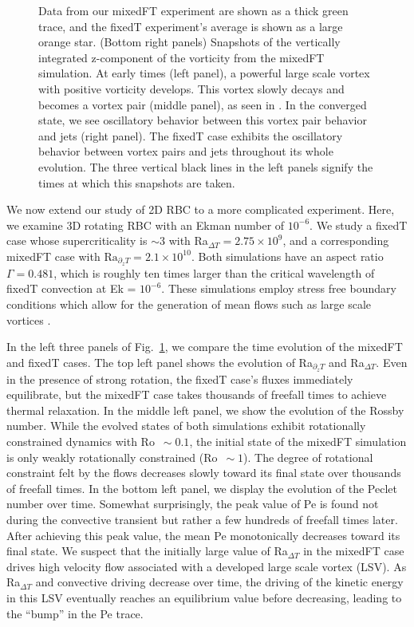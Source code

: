 \documentclass[aps, pre, onecolumn, nofootinbib, notitlepage, groupedaddress, amsfonts, amssymb, amsmath, longbibliography]{revtex4-1}
\begin{document}
\begin{figure}
{	Data from our mixedFT experiment are shown as a thick green trace, and the fixedT experiment's average is shown as a large orange star.
	(Bottom right panels) Snapshots of the vertically integrated z-component of the vorticity from the mixedFT simulation.
	At early times (left panel), a powerful large scale vortex with positive vorticity develops.
	This vortex slowly decays and becomes a vortex pair (middle panel), as seen in \cite{stellmach&all2014}.
	In the converged state, we see oscillatory behavior between this vortex pair behavior and jets (right panel).
	The fixedT case exhibits the oscillatory behavior between vortex pairs and jets throughout its whole evolution.
	The three vertical black lines in the left panels signify the times at which this snapshots are taken.
\label{fig:rotating_panels} }
\end{figure}



We now extend our study of 2D RBC to a more complicated experiment.
Here, we examine 3D rotating RBC with an Ekman number of $10^{-6}$.
We study a fixedT case whose supercriticality is $\sim 3$ with Ra$_{\Delta T} = 2.75\times 10^9$, and a corresponding mixedFT case with $\text{Ra}_{\partial_z T} = 2.1 \times 10^{10}$.
Both simulations have an aspect ratio $\Gamma = 0.481$, which is roughly ten times larger than the critical wavelength of fixedT convection at Ek = $10^{-6}$.
These simulations employ stress free boundary conditions which allow for the generation of mean flows such as large scale vortices \cite{couston&all2019}.

In the left three panels of Fig.~\ref{fig:rotating_panels}, we compare the time evolution of the mixedFT and fixedT cases.
The top left panel shows the evolution of Ra$_{\partial_z T}$ and Ra$_{\Delta T}$.
Even in the presence of strong rotation, the fixedT case's fluxes immediately equilibrate, but the mixedFT case takes thousands of freefall times to achieve thermal relaxation.
In the middle left panel, we show the evolution of the Rossby number.
While the evolved states of both simulations exhibit rotationally constrained dynamics with Ro $\,\sim 0.1$, the initial state of the mixedFT simulation is only weakly rotationally constrained (Ro $\,\sim 1$).
The degree of rotational constraint felt by the flows decreases slowly toward its final state over thousands of freefall times.
In the bottom left panel, we display the evolution of the Peclet number over time.
Somewhat surprisingly, the peak value of Pe is found not during the convective transient but rather a few hundreds of freefall times later.
After achieving this peak value, the mean Pe monotonically decreases toward its final state.
We suspect that the initially large value of Ra$_{\Delta T}$ in the mixedFT case drives high velocity flow associated with a developed large scale vortex (LSV).
As Ra$_{\Delta T}$ and convective driving decrease over time, the driving of the kinetic energy in this LSV eventually reaches an equilibrium value before decreasing, leading to the ``bump'' in the Pe trace.
\end{document}
